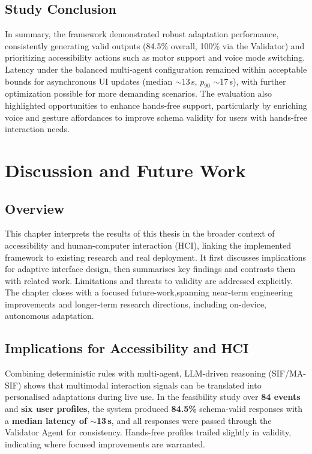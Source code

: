 \documentclass[openany]{book}
\begin{document}
\section{Study Conclusion}
In summary, the framework demonstrated robust adaptation performance, consistently generating valid outputs (84.5\% overall, 100\% via the Validator) and prioritizing accessibility actions such as motor support and voice mode switching. Latency under the balanced multi-agent configuration remained within acceptable bounds for asynchronous UI updates (median $\sim$13\,s, $p_{90}$ $\sim$17\,s), with further optimization possible for more demanding scenarios. The evaluation also highlighted opportunities to enhance hands-free support, particularly by enriching voice and gesture affordances to improve schema validity for users with hands-free interaction needs.

\chapter{Discussion and Future Work}

\section{Overview}
This chapter interprets the results of this thesis in the broader context of accessibility and human-computer interaction (HCI), linking the implemented framework to existing research and real deployment. It first discusses implications for adaptive interface design, then summarises key findings and contrasts them with related work. Limitations and threats to validity are addressed explicitly. The chapter closes with a focused future-work,spanning near-term engineering improvements and longer-term research directions, including on-device, autonomous adaptation.

\section{Implications for Accessibility and HCI}
Combining deterministic rules with multi-agent, LLM-driven reasoning (SIF/MA-SIF) shows that multimodal interaction signals can be translated into personalised adaptations during live use. In the feasibility study over \textbf{84 events} and \textbf{six user profiles}, the system produced \textbf{84.5\%} schema-valid responses with a \textbf{median latency of $\sim$13\,s}, and all responses were passed through the Validator Agent for consistency. Hands-free profiles trailed slightly in validity, indicating where focused improvements are warranted.
\end{document}
